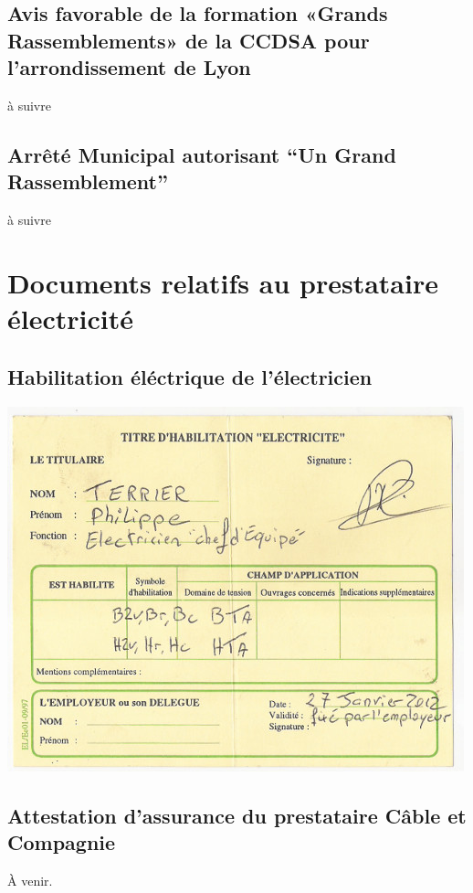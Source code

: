\documentclass[hidelinks, paper=a4, fontsize=13pt]{report}
\begin{document}
\subsection{Avis favorable de la formation «Grands Rassemblements» de la CCDSA pour l’arrondissement de Lyon}
à suivre

\subsection{Arrêté Municipal autorisant “Un Grand Rassemblement”}
à suivre

\section{Documents relatifs au prestataire électricité}
\subsection{Habilitation éléctrique de l'électricien}
\begin{center}
\includegraphics[scale=0.8]{Annexes/Documents/HabilitationPhilty}
\end{center}

\subsection{Attestation d'assurance du prestataire Câble et Compagnie}
À venir.
%
\newpage
\end{document}
